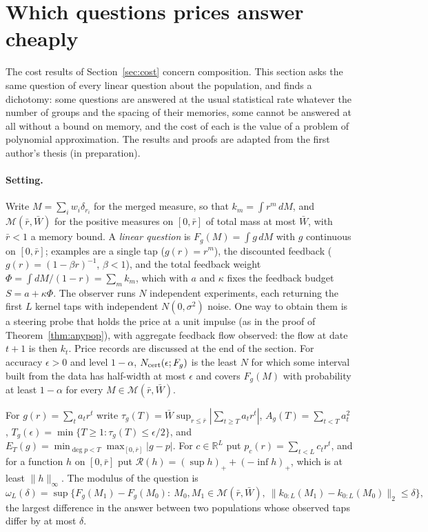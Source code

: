\section{Which questions prices answer cheaply}\label{app:questions}

The cost results of Section~\ref{sec:cost} concern composition. This section asks the same question of every linear question about the population, and finds a dichotomy: some questions are answered at the usual statistical rate whatever the number of groups and the spacing of their memories, some cannot be answered at all without a bound on memory, and the cost of each is the value of a problem of polynomial approximation. The results and proofs are adapted from the first author's thesis (in preparation).

\paragraph{Setting.} Write $M=\sum_iw_i\delta_{r_i}$ for the merged measure, so that $k_m=\int r^m\,dM$, and $\mathcal M(\bar r,\bar W)$ for the positive measures on $[0,\bar r]$ of total mass at most $\bar W$, with $\bar r<1$ a memory bound. A \emph{linear question} is $F_g(M)=\int g\,dM$ with $g$ continuous on $[0,\bar r]$; examples are a single tap ($g(r)=r^m$), the discounted feedback ($g(r)=(1-\beta r)^{-1}$, $\beta<1$), and the total feedback weight $\Phi=\int dM/(1-r)=\sum_m k_m$, which with $a$ and $\kappa$ fixes the feedback budget $S=a+\kappa\Phi$. The observer runs $N$ independent experiments, each returning the first $L$ kernel taps with independent $N(0,\sigma^2)$ noise. One way to obtain them is a steering probe that holds the price at a unit impulse (as in the proof of Theorem~\ref{thm:anypop}), with aggregate feedback flow observed: the flow at date $t+1$ is then $k_t$. Price records are discussed at the end of the section. For accuracy $\epsilon>0$ and level $1-\alpha$, $N_{\rm cert}(\epsilon;F_g)$ is the least $N$ for which some interval built from the data has half-width at most $\epsilon$ and covers $F_g(M)$ with probability at least $1-\alpha$ for every $M\in\mathcal M(\bar r,\bar W)$.

For $g(r)=\sum_ta_tr^t$ write $\tau_g(T)=\bar W\sup_{r\le\bar r}|\sum_{t\ge T}a_tr^t|$, $A_g(T)=\sum_{t<T}a_t^2$, $T_g(\epsilon)=\min\{T\ge1:\tau_g(T)\le\epsilon/2\}$, and $E_T(g)=\min_{\deg p<T}\max_{[0,\bar r]}|g-p|$. For $c\in\mathbb R^L$ put $p_c(r)=\sum_{t<L}c_tr^t$, and for a function $h$ on $[0,\bar r]$ put $\mathcal R(h)=(\sup h)_++(-\inf h)_+$, which is at least $\|h\|_\infty$. The modulus of the question is
\[
 \omega_L(\delta)=\sup\bigl\{F_g(M_1)-F_g(M_0):\ M_0,M_1\in\mathcal M(\bar r,\bar W),\ \|k_{0:L}(M_1)-k_{0:L}(M_0)\|_2\le\delta\bigr\},
\]
the largest difference in the answer between two populations whose observed taps differ by at most $\delta$.


